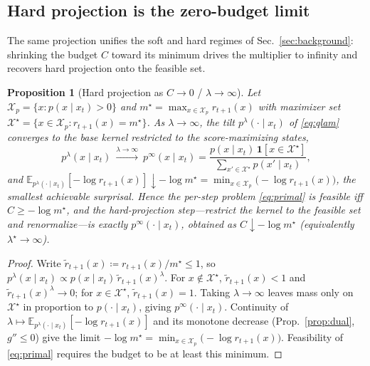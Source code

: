 \documentclass{article}
\newtheorem{proposition}{Proposition}
\newcommand{\E}{\mathbb{E}}
\newcommand{\X}{\mathcal{X}}
\newcommand{\lstar}{\lambda^{\star}}
\begin{document}
\subsection{Hard projection is the zero-budget limit}
The same projection unifies the soft and hard regimes of Sec.~\ref{sec:background}: shrinking the budget $C$ toward its minimum drives the multiplier to infinity and recovers hard projection onto the feasible set.

\begin{proposition}[Hard projection as $C\to0$ / $\lambda\to\infty$]
\label{prop:hard}
Let $\X_p=\{x:p(x\mid x_t)>0\}$ and $m^\star=\max_{x\in\X_p}r_{t+1}(x)$ with maximizer set $\X^\star=\{x\in\X_p:r_{t+1}(x)=m^\star\}$. As $\lambda\to\infty$, the tilt $p^{\lambda}(\cdot\mid x_t)$ of \eqref{eq:qlam} converges to the base kernel restricted to the score-maximizing states,
\begin{equation}
p^{\lambda}(x\mid x_t)\ \xrightarrow{\lambda\to\infty}\
p^{\infty}(x\mid x_t)=\frac{p(x\mid x_t)\,\mathbf 1[x\in\X^\star]}{\sum_{x'\in\X^\star}p(x'\mid x_t)},
\end{equation}
and $\E_{p^{\lambda}(\cdot\mid x_t)}[-\log r_{t+1}(x)]\downarrow -\log m^\star=\min_{x\in\X_p}\big(-\log r_{t+1}(x)\big)$, the smallest achievable surprisal. Hence the per-step problem \eqref{eq:primal} is feasible iff $C\ge-\log m^\star$, and the hard-projection step---restrict the kernel to the feasible set and renormalize---is exactly $p^{\infty}(\cdot\mid x_t)$, obtained as $C\downarrow -\log m^\star$ (equivalently $\lstar\to\infty$).
\end{proposition}
\begin{proof}
Write $\tilde r_{t+1}(x)\coloneqq r_{t+1}(x)/m^\star\le1$, so $p^{\lambda}(x\mid x_t)\propto p(x\mid x_t)\,\tilde r_{t+1}(x)^\lambda$. For $x\notin\X^\star$, $\tilde r_{t+1}(x)<1$ and $\tilde r_{t+1}(x)^\lambda\to0$; for $x\in\X^\star$, $\tilde r_{t+1}(x)=1$. Taking $\lambda\to\infty$ leaves mass only on $\X^\star$ in proportion to $p(\cdot\mid x_t)$, giving $p^{\infty}(\cdot\mid x_t)$. Continuity of $\lambda\mapsto\E_{p^{\lambda}(\cdot\mid x_t)}[-\log r_{t+1}(x)]$ and its monotone decrease (Prop.~\ref{prop:dual}, $g''\le0$) give the limit $-\log m^\star=\min_{x\in\X_p}\big(-\log r_{t+1}(x)\big)$. Feasibility of \eqref{eq:primal} requires the budget to be at least this minimum.
\end{proof}
\end{document}
